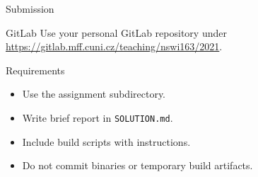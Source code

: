 \begin{frame}{Submission}
    \begin{block}{GitLab}
        Use your personal GitLab repository under \\
        \url{https://gitlab.mff.cuni.cz/teaching/nswi163/2021}.
    \end{block}
    \begin{block}{Requirements}
        \begin{itemize}
            \item Use the assignment subdirectory.
            \item Write brief report in \lstinline{SOLUTION.md}.
            \item Include build scripts with instructions.
            \item Do not commit binaries or temporary build artifacts.
        \end{itemize}
    \end{block}
\end{frame}


